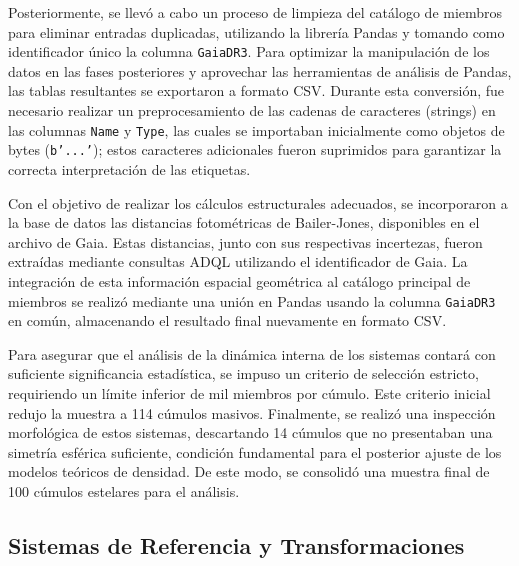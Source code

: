             Posteriormente, se llevó a cabo un proceso de limpieza del catálogo 
            de miembros para eliminar entradas duplicadas, utilizando la 
            librería Pandas y tomando como identificador único la columna 
            \texttt{GaiaDR3}. Para optimizar la manipulación de los datos en las 
            fases posteriores y aprovechar las herramientas de análisis de 
            Pandas, las tablas resultantes se exportaron a formato CSV. Durante 
            esta conversión, fue necesario realizar un preprocesamiento de las 
            cadenas de caracteres (strings) en las columnas \texttt{Name} y 
            \texttt{Type}, las cuales se importaban inicialmente como objetos de 
            bytes (\texttt{b'...'}); estos caracteres adicionales fueron 
            suprimidos para garantizar la correcta interpretación de las 
            etiquetas.

            Con el objetivo de realizar los cálculos estructurales adecuados, se 
            incorporaron a la base de datos las distancias fotométricas de 
            Bailer-Jones, disponibles en el archivo de Gaia. Estas distancias, 
            junto con sus respectivas incertezas, fueron extraídas mediante 
            consultas ADQL utilizando el identificador de Gaia. La integración 
            de esta información espacial geométrica al catálogo principal de 
            miembros se realizó mediante una unión en Pandas usando la columna 
            \texttt{GaiaDR3} en común, almacenando el resultado final nuevamente 
            en formato CSV.

            Para asegurar que el análisis de la dinámica interna de los sistemas 
            contará con suficiente significancia estadística, se impuso un 
            criterio de selección estricto, requiriendo un límite inferior de 
            mil miembros por cúmulo. Este criterio inicial redujo la muestra a 
            114 cúmulos masivos. Finalmente, se realizó una inspección 
            morfológica de estos sistemas, descartando 14 cúmulos que no 
            presentaban una simetría esférica suficiente, condición fundamental 
            para el posterior ajuste de los modelos teóricos de densidad. De 
            este modo, se consolidó una muestra final de 100 cúmulos estelares 
            para el análisis.

        \subsection{Sistemas de Referencia y Transformaciones}

